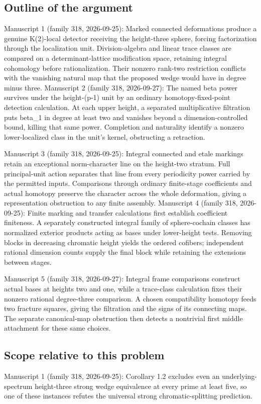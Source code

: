 \documentclass[11pt]{article}
\begin{document}
\subsection{Outline of the argument}
Manuscript 1 (family 318, 2026-09-25): Marked connected deformations produce a genuine K(2)-local detector receiving the height-three sphere, forcing factorization through the localization unit. Division-algebra and linear trace classes are compared on a determinant-lattice modification space, retaining integral cohomology before rationalization. Their nonzero rank-two restriction conflicts with the vanishing natural map that the proposed wedge would have in degree minus three. Manuscript 2 (family 318, 2026-09-27): The named beta power survives under the height-(p-1) unit by an ordinary homotopy-fixed-point detection calculation. At each upper height, a separated multiplicative filtration puts beta\_1 in degree at least two and vanishes beyond a dimension-controlled bound, killing that same power. Completion and naturality identify a nonzero lower-localized class in the unit's kernel, obstructing a retraction.

Manuscript 3 (family 318, 2026-09-25): Integral connected and etale markings retain an exceptional norm-character line on the height-two stratum. Full principal-unit action separates that line from every periodicity power carried by the permitted inputs. Comparisons through ordinary finite-stage coefficients and actual homotopy preserve the character across the whole deformation, giving a representation obstruction to any finite assembly. Manuscript 4 (family 318, 2026-09-25): Finite marking and transfer calculations first establish coefficient finiteness. A separately constructed integral family of sphere-cochain classes has normalized exterior products acting as bases under lower-height tests. Removing blocks in decreasing chromatic height yields the ordered cofibers; independent rational dimension counts supply the final block while retaining the extensions between stages.

Manuscript 5 (family 318, 2026-09-27): Integral frame comparisons construct actual bases at heights two and one, while a trace-class calculation fixes their nonzero rational degree-three comparison. A chosen compatibility homotopy feeds two fracture squares, giving the filtration and the signs of its connecting maps. The separate canonical-map obstruction then detects a nontrivial first middle attachment for these same choices.

\subsection{Scope relative to this problem}
Manuscript 1 (family 318, 2026-09-25): Corollary 1.2 excludes even an underlying-spectrum height-three strong wedge equivalence at every prime at least five, so one of these instances refutes the universal strong chromatic-splitting prediction.
\end{document}
